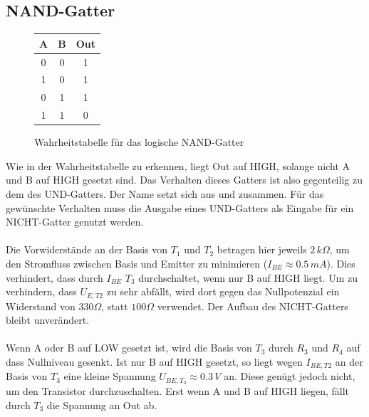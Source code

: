 \subsection{NAND-Gatter}
\begin{figure}[h]
	\centering
	\hspace{1cm}
	\begin{tabular}{|c|c|c|}
		\hline
		\textbf{A} & \textbf{B} & \textbf{Out} \\
		\hline
		0 & 0 & 1 \\
		1 & 0 & 1 \\
		0 & 1 & 1 \\
		1 & 1 & 0 \\
		\hline
	\end{tabular}
	\caption{Wahrheitstabelle für das logische NAND-Gatter}
\end{figure}
Wie in der Wahrheitstabelle zu erkennen, liegt Out auf HIGH, solange nicht A und B auf HIGH gesetzt sind. Das Verhalten dieses Gatters ist also gegenteilig zu dem des UND-Gatters. Der Name  setzt sich aus  und  zusammen. Für das gewünschte Verhalten muss die Ausgabe eines UND-Gatters als Eingabe für ein NICHT-Gatter genutzt werden.\\\\
Die Vorwiderstände an der Basis von $T_1$ und $T_2$ betragen hier jeweils $2\,k\Omega$, um den Stromfluss zwischen Basis und Emitter zu minimieren ($I_{BE} \approx 0.5\,mA$). Dies verhindert, dass durch $I_{BE}$ $T_3$ durchschaltet, wenn nur B auf HIGH liegt. Um zu verhindern, dass $U_{E,T2}$ zu sehr abfällt, wird dort gegen das Nullpotenzial ein Widerstand von $330\Omega$, statt $100\Omega$ verwendet. Der Aufbau des NICHT-Gatters bleibt unverändert.\\\\
Wenn A oder B auf LOW gesetzt ist, wird die Basis von $T_3$ durch $R_3$ und $R_4$ auf dass Nullniveau gesenkt. Ist nur B auf HIGH gesetzt, so liegt wegen $I_{BE,T2}$ an der Basis von $T_3$ eine kleine Spannung $U_{BE,T_3} \approx 0.3\,V$ an. Diese genügt jedoch nicht, um den Transistor durchzuschalten. Erst wenn A und B auf HIGH liegen, fällt durch $T_3$ die Spannung an Out ab.\\

